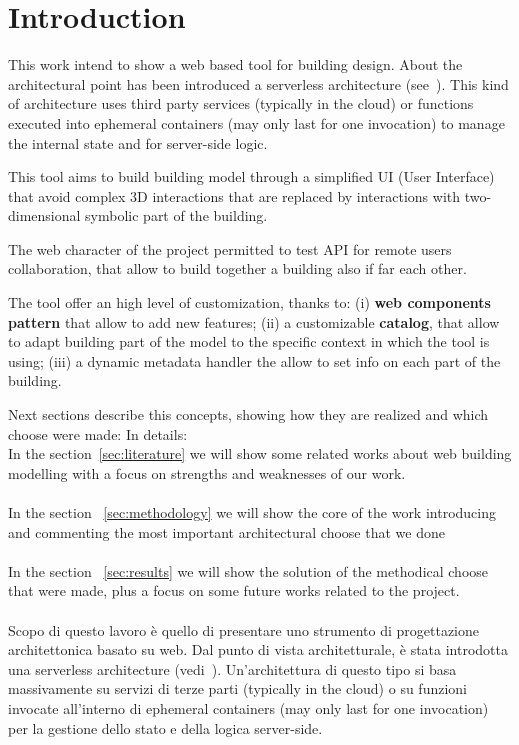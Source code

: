 \section{Introduction}

This work intend to show a web based tool for building design. About the architectural point has been introduced a serverless architecture (see~\cite{Roberts}). This kind of architecture uses third party services (typically in the cloud) or functions executed into ephemeral containers (may only last for one invocation) to manage the internal state and for server-side logic.

This tool aims to build building model through a simplified UI (User Interface) that avoid complex 3D interactions that are replaced by interactions with two-dimensional symbolic part of the building.

The web character of the project permitted to test API for remote users collaboration, that allow to build together a building also if far each other.

The tool offer an high level of customization, thanks to: (i) \textbf{web components pattern} that allow to add new features; (ii) a customizable \textbf{catalog}, that allow to adapt building part of the model to the specific context in which the tool is using; (iii) a dynamic metadata handler the allow to set info on each part of the building.

Next sections describe this concepts, showing how they are realized and which choose were made:
 In details:\\

In the section~\ref{sec:literature} we will show some related works about web building modelling with a focus on strengths and weaknesses of our work.\\\\
In the section ~\ref{sec:methodology} we will show the core of the work introducing and commenting the most important architectural choose that we done\\\\
In the section ~\ref{sec:results} we will show the solution of the methodical choose that were made, plus a focus on some future works related to the project.\\\\


\iffalse
Scopo di questo lavoro \`e quello di presentare uno strumento di progettazione architettonica basato su web. Dal punto di vista architetturale, \`e stata introdotta una serverless architecture (vedi~\cite{Roberts}). Un'architettura di questo tipo si basa massivamente su servizi di terze parti (typically in the cloud) o su funzioni invocate all'interno di ephemeral containers (may only last for one invocation) per la gestione dello stato e della logica server-side.

